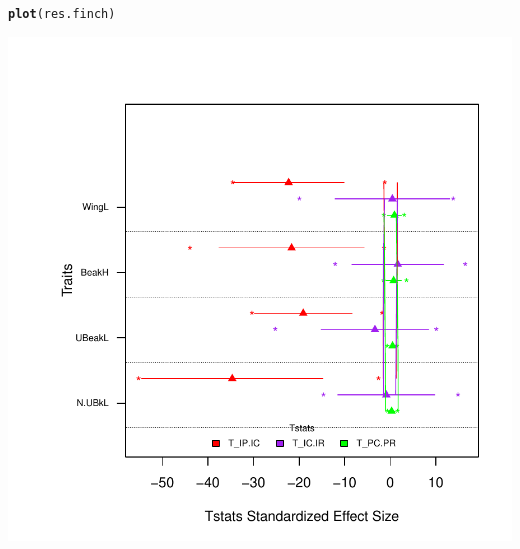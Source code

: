 \documentclass[12pt]{article}\usepackage[]{graphicx}\usepackage[]{color}
\makeatletter
\def\maxwidth{ %
  \ifdim\Gin@nat@width>\linewidth
    \linewidth
  \else
    \Gin@nat@width
  \fi
}
\newcommand{\hlstd}[1]{\textcolor[rgb]{0.345,0.345,0.345}{#1}}%
\newcommand{\hlkwd}[1]{\textcolor[rgb]{0.737,0.353,0.396}{\textbf{#1}}}%
\newenvironment{kframe}{%
 \def\at@end@of@kframe{}%
 \ifinner\ifhmode%
  \def\at@end@of@kframe{\end{minipage}}%
  \begin{minipage}{\columnwidth}%
 \fi\fi%
 \def\FrameCommand##1{\hskip\@totalleftmargin \hskip-\fboxsep
 \colorbox{shadecolor}{##1}\hskip-\fboxsep
     \hskip-\linewidth \hskip-\@totalleftmargin \hskip\columnwidth}%
 \MakeFramed {\advance\hsize-\width
   \@totalleftmargin\z@ \linewidth\hsize
   \@setminipage}}%
 {\par\unskip\endMakeFramed%
 \at@end@of@kframe}
\newenvironment{knitrout}{}{} %
\makeatother
\begin{document}
\begin{knitrout}
\color{fgcolor}\begin{kframe}
\begin{alltt}
\hlkwd{plot}\hlstd{(res.finch)}
\end{alltt}
\end{kframe}

{\centering \includegraphics[width=\maxwidth]{figure/unnamed-chunk-21} 

}



\end{knitrout}
\end{document}
